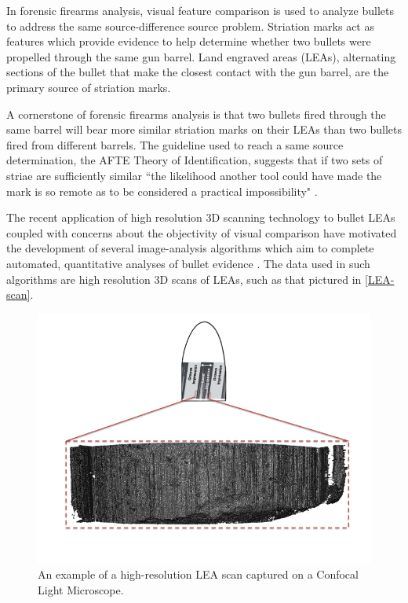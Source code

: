 \documentclass[12pt]{article}
\begin{document}
In forensic firearms analysis, visual feature comparison is used to
analyze bullets to address the same source-difference source problem.
Striation marks act as features which provide evidence to help determine
whether two bullets were propelled through the same gun barrel. Land
engraved areas (LEAs), alternating sections of the bullet that make the
closest contact with the gun barrel, are the primary source of striation
marks.

A cornerstone of forensic firearms analysis is that two bullets fired
through the same barrel will bear more similar striation marks on their
LEAs than two bullets fired from different barrels. The guideline used
to reach a same source determination, the AFTE Theory of Identification,
suggests that if two sets of striae are sufficiently similar ``the
likelihood another tool could have made the mark is so remote as to be
considered a practical impossibility" \citep{AFTE}.

The recent application of high resolution 3D scanning technology to
bullet LEAs coupled with concerns about the objectivity of visual
comparison have motivated the development of several image-analysis
algorithms which aim to complete automated, quantitative analyses of
bullet evidence
\citep[see][]{DeKinder1, DeKinder2, Bachrach1, Ma1, Chu1, Chu2, Hare1}.
The data used in such algorithms are high resolution 3D scans of LEAs,
such as that pictured in \autoref{LEA-scan}.

\begin{figure}
\includegraphics[width=\textwidth]{../images/3d_plot_top_context_breakoff.png}
\caption{An example of a high-resolution LEA scan captured on a Confocal Light Microscope.}
\label{LEA-scan}
\end{figure}
\end{document}
